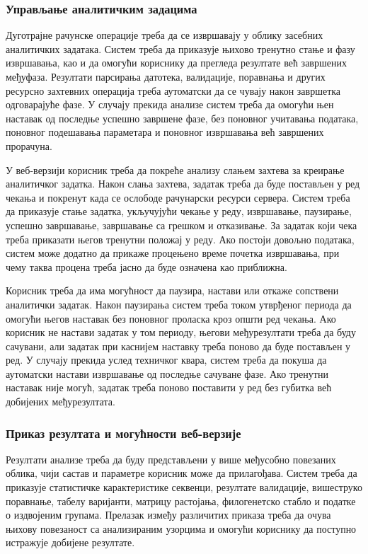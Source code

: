 \documentclass[12pt,oneside]{memoir}
\begin{document}
\subsubsection{Управљање аналитичким задацима}
Дуготрајне рачунске операције треба да се извршавају у облику засебних аналитичких задатака. Систем треба да приказује њихово тренутно стање и фазу извршавања, као и да омогући кориснику да прегледа резултате већ завршених међуфаза. Резултати парсирања датотека, валидације, поравнања и других ресурсно захтевних операција треба аутоматски да се чувају након завршетка одговарајуће фазе. У случају прекида анализе систем треба да омогући њен наставак од последње успешно завршене фазе, без поновног учитавања података, поновног подешавања параметара и поновног извршавања већ завршених прорачуна.

У веб-верзији корисник треба да покреће анализу слањем захтева за креирање аналитичког задатка. Након слања захтева, задатак треба да буде постављен у ред чекања и покренут када се ослободе рачунарски ресурси сервера. Систем треба да приказује стање задатка, укључујући чекање у реду, извршавање, паузирање, успешно завршавање, завршавање са грешком и отказивање. За задатак који чека треба приказати његов тренутни положај у реду. Ако постоји довољно података, систем може додатно да прикаже процењено време почетка извршавања, при чему таква процена треба јасно да буде означена као приближна.

Корисник треба да има могућност да паузира, настави или откаже сопствени аналитички задатак. Након паузирања систем треба током утврђеног периода да омогући његов наставак без поновног проласка кроз општи ред чекања. Ако корисник не настави задатак у том периоду, његови међурезултати треба да буду сачувани, али задатак при каснијем наставку треба поново да буде постављен у ред. У случају прекида услед техничког квара, систем треба да покуша да аутоматски настави извршавање од последње сачуване фазе. Ако тренутни наставак није могућ, задатак треба поново поставити у ред без губитка већ добијених међурезултата.


\subsubsection{Приказ резултата и могућности веб-верзије}
Резултати анализе треба да буду представљени у више међусобно повезаних облика, чији састав и параметре корисник може да прилагођава. Систем треба да приказује статистичке карактеристике секвенци, резултате валидације, вишеструко поравнање, табелу варијанти, матрицу растојања, филогенетско стабло и податке о издвојеним групама. Прелазак између различитих приказа треба да очува њихову повезаност са анализираним узорцима и омогући кориснику да поступно истражује добијене резултате.
\end{document}
